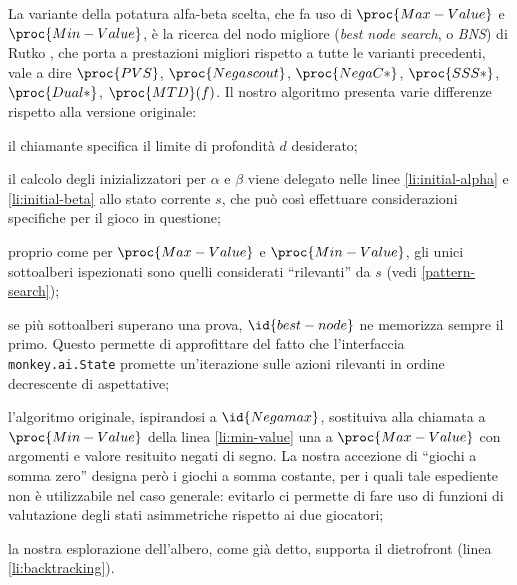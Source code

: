 \documentclass{article}
\begin{document}
La variante della potatura alfa-beta scelta, che fa uso di $\proc{Max-Value}$ e
$\proc{Min-Value}$, è la ricerca del nodo migliore (\emph{best node search}, o
\emph{BNS}) di Rutko \cite{edseul.200009163084620110101}, che porta a
prestazioni migliori rispetto a tutte le varianti precedenti, vale a dire
$\proc{PVS}$, $\proc{Negascout}$, $\proc{NegaC*}$, $\proc{SSS*}$,
$\proc{Dual*}$, $\proc{MTD}(f)$. Il nostro algoritmo presenta varie differenze
rispetto alla versione originale:
\begin{itemize}
    \item il chiamante specifica il limite di profondità $d$ desiderato;
    \item il calcolo degli inizializzatori per $\alpha$ e $\beta$ viene delegato
      nelle linee \ref{li:initial-alpha} e \ref{li:initial-beta} allo stato
      corrente $s$, che può così effettuare considerazioni specifiche per il
      gioco in questione;
    \item proprio come per $\proc{Max-Value}$ e $\proc{Min-Value}$, gli unici
      sottoalberi ispezionati sono quelli considerati ``rilevanti'' da $s$ (vedi
      \ref{pattern-search});
    \begin{sloppypar}
    \item se più sottoalberi superano una prova, $\id{best-node}$ ne memorizza
      sempre il primo. Questo permette di approfittare del fatto che
      l'interfaccia \verb!monkey.ai.State! promette un'iterazione sulle azioni
      rilevanti in ordine decrescente di aspettative;
    \end{sloppypar}
    \item l'algoritmo originale, ispirandosi a $\id{Negamax}$, sostituiva alla
      chiamata a $\proc{Min-Value}$ della linea \ref{li:min-value} una a
      $\proc{Max-Value}$ con argomenti e valore resituito negati di segno. La
      nostra accezione di ``giochi a somma zero'' designa però i giochi a somma
      costante, per i quali tale espediente non è utilizzabile nel caso
      generale: evitarlo ci permette di fare uso di funzioni di valutazione
      degli stati asimmetriche rispetto ai due giocatori;
    \item la nostra esplorazione dell'albero, come già detto, supporta il
      dietrofront (linea \ref{li:backtracking}).
\end{itemize}
\end{document}
